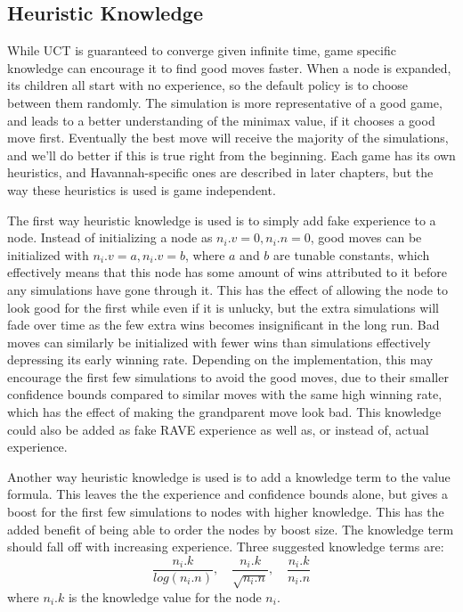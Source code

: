 \subsection{Heuristic Knowledge}\label{sec:heuristicknowledge}

While UCT is guaranteed to converge given infinite time, game specific knowledge can encourage it to find good moves faster. When a node is expanded, its children all start with no experience, so the default policy is to choose between them randomly. The simulation is more representative of a good game, and leads to a better understanding of the minimax value, if it chooses a good move first. Eventually the best move will receive the majority of the simulations, and we'll do better if this is true right from the beginning. Each game has its own heuristics, and Havannah-specific ones are described in later chapters, but the way these heuristics is used is game independent.

The first way heuristic knowledge is used is to simply add fake experience to a node. Instead of initializing a node as $n_i.v = 0, n_i.n = 0$, good moves can be initialized with $n_i.v = a, n_i.v = b$, where $a$ and $b$ are tunable constants, which effectively means that this node has some amount of wins attributed to it before any simulations have gone through it. This has the effect of allowing the node to look good for the first while even if it is unlucky, but the extra simulations will fade over time as the few extra wins becomes insignificant in the long run. Bad moves can similarly be initialized with fewer wins than simulations effectively depressing its early winning rate. Depending on the implementation, this may encourage the first few simulations to avoid the good moves, due to their smaller confidence bounds compared to similar moves with the same high winning rate, which has the effect of making the grandparent move look bad. This knowledge could also be added as fake RAVE experience as well as, or instead of, actual experience.

Another way heuristic knowledge is used is to add a knowledge term to the value formula. This leaves the the experience and confidence bounds alone, but gives a boost for the first few simulations to nodes with higher knowledge. This has the added benefit of being able to order the nodes by boost size. The knowledge term should fall off with increasing experience. Three suggested knowledge terms are: $$\frac{n_i.k}{log(n_i.n)}, \quad \frac{n_i.k}{\sqrt{n_i.n}}, \quad \frac{n_i.k}{n_i.n}$$ where $n_i.k$ is the knowledge value for the node $n_i$.


